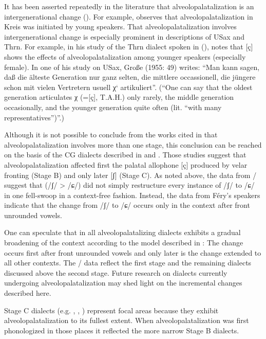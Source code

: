 \begin{xlist}
It has been asserted repeatedly in the literature that alveolopalatalization is an intergenerational change (). For example, \citet{Kuck1933} observes that alveolopalatalization in Kreis  was initiated by young speakers. That alveolopalatalization involves intergenerational change is especially prominent in descriptions of USax and Thrn. For example, in his study of the Thrn dialect spoken in  (), \citet[61]{Dietrich1957} notes that [ç] shows the effects of alveolopalatalization among younger speakers (especially female). In one of his study on USax, Große (1955: 49) writes: “Man kann sagen, daß die älteste Generation nur ganz selten, die mittlere occassionell, die jüngere schon mit vielen Vertretern usuell χ‘ artikuliert”. (“One can say that the oldest generation articulates χ (=[ç], T.A.H.) only rarely, the middle generation occasionally, and the younger generation quite often (lit. “with many representatives”)”.)

Although it is not possible to conclude from the works cited in  that alveolopalatalization involves more than one stage, this conclusion can be reached on the basis of the CG dialects described in  and . Those studies suggest that alveolopalatalization affected first the palatal allophone [ç] produced by velar fronting (Stage B) and only later [ʃ] (Stage C). As noted above, the data from / suggest that  (/ʃ/ > /ɕ/) did not simply restructure every instance of /ʃ/ to /ɕ/ in one fell-swoop in a context-free fashion. Instead, the data from Féry’s speakers indicate that the change from /ʃ/ to /ɕ/ occurs only in the context after front unrounded vowels.

One can speculate that  in all alveolopalatalizing dialects exhibits a gradual broadening of the context according to the  model described in : The change occurs first after front unrounded vowels and only later is the change extended to all other contexts. The / data reflect the first stage and the remaining dialects discussed above the second stage. Future research on dialects currently undergoing alveolopalatalization may shed light on the incremental changes described here.

Stage C dialects (e.g. , , ) represent focal areas because they exhibit alveolopalatalization to its fullest extent. When alveolopalatalization was first phonologized in those places it reflected the more narrow Stage B dialects.


\end{xlist}
